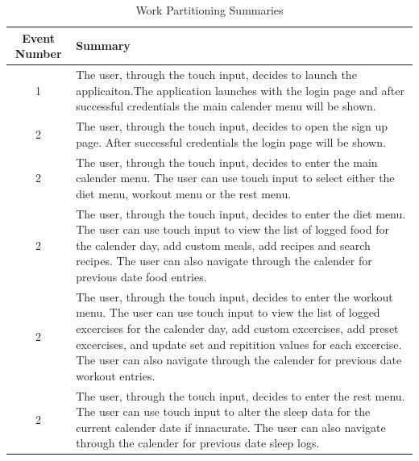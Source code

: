 \documentclass[12pt,letterpaper]{article}
\begin{document}
\begin{table}[h]
\caption{Work Partitioning Summaries}
    \centering
    \begin{tabular}{|c|p{10cm}|}
    \hline
    \textbf{Event Number} & \textbf{Summary} \\
    \hline
    1 & The user, through the touch input, decides to launch the applicaiton.The application launches with the login page and after successful credentials the main calender menu will be shown. \\
    \hline
    2 & The user, through the touch input, decides to open the sign up page. After successful credentials the login page will be shown. \\
    \hline
    2 & The user, through the touch input, decides to enter the main calender menu. The user can use touch input to select either the diet menu, workout menu or the rest menu. \\
    \hline
    2 & The user, through the touch input, decides to enter the diet menu. The user can use touch input to view the list of logged food for the calender day, add custom meals, add recipes and search recipes. The user can also navigate through the calender for previous date food entries. \\
    \hline
    2 & The user, through the touch input, decides to enter the workout menu. The user can use touch input to view the list of logged excercises for the calender day, add custom excercises, add preset excercises, and update set and repitition values for each excercise. The user can also navigate through the calender for previous date workout entries. \\
    \hline
    2 & The user, through the touch input, decides to enter the rest menu. The user can use touch input to alter the sleep data for the current calender date if innacurate. The user can also navigate through the calender for previous date sleep logs. \\
    \hline
    \end{tabular}
\end{table}
\end{document}
